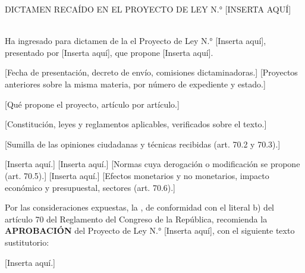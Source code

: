 \documentclass{dictamen}
\begin{document}

\begin{center}
  {\fuentedisplaysemi\color{colortitulos}\MakeUppercase{Dictamen recaído en el Proyecto de Ley N.° [Inserta aquí]}}\\[2pt]
   \textperiodcentered\ 
\end{center}
\vspace{0.6\baselineskip}

\noindent Ha ingresado para dictamen de la  el Proyecto de Ley N.°
[Inserta aqu\'i], presentado por [Inserta aqu\'i], que propone [Inserta aqu\'i].

[Fecha de presentaci\'on, decreto de env\'io, comisiones dictaminadoras.]
[Proyectos anteriores sobre la misma materia, por n\'umero de expediente y estado.]

[Qu\'e propone el proyecto, art\'iculo por art\'iculo.]

[Constituci\'on, leyes y reglamentos aplicables, verificados sobre el texto.]

[Sumilla de las opiniones ciudadanas y t\'ecnicas recibidas (art. 70.2 y 70.3).]

[Inserta aqu\'i.]
[Inserta aqu\'i.]
[Normas cuya derogaci\'on o modificaci\'on se propone (art. 70.5).]
[Inserta aqu\'i.]
[Efectos monetarios y no monetarios, impacto econ\'omico y presupuestal, sectores (art. 70.6).]

Por las consideraciones expuestas, la , de conformidad con el
literal b) del art\'iculo 70 del Reglamento del Congreso de la Rep\'ublica,
recomienda la \textbf{APROBACI\'ON} del Proyecto de Ley N.° [Inserta aqu\'i],
con el siguiente texto sustitutorio:

[Inserta aqu\'i.]

\formuladeestilo

\firmaslegislativas
\end{document}
